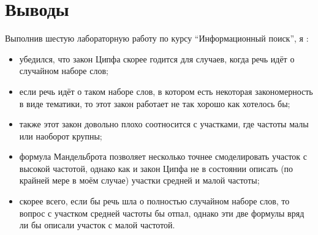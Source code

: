 \section{Выводы}

Выполнив шестую лабораторную работу по курсу \enquote{Информационный поиск}, я :
\begin{itemize}
    \item убедился, что закон Ципфа скорее годится для случаев, когда речь идёт о случайном наборе слов;
    \item если речь идёт о таком наборе слов, в котором есть некоторая закономерность в виде тематики, то этот закон работает не так хорошо как хотелось бы;
    \item также этот закон довольно плохо соотносится с участками, где частоты малы или наоборот крупны;
    \item формула Мандельброта позволяет несколько точнее смоделировать участок с высокой частотой, однако как и закон Ципфа не в состоянии описать (по крайней мере в моём случае) участки средней и малой частоты;
    \item скорее всего, если бы речь шла о полностью случайном наборе слов, то вопрос с участком средней частоты бы отпал, однако эти две формулы вряд ли бы описали участок с малой частотой.
\end{itemize}
\pagebreak
